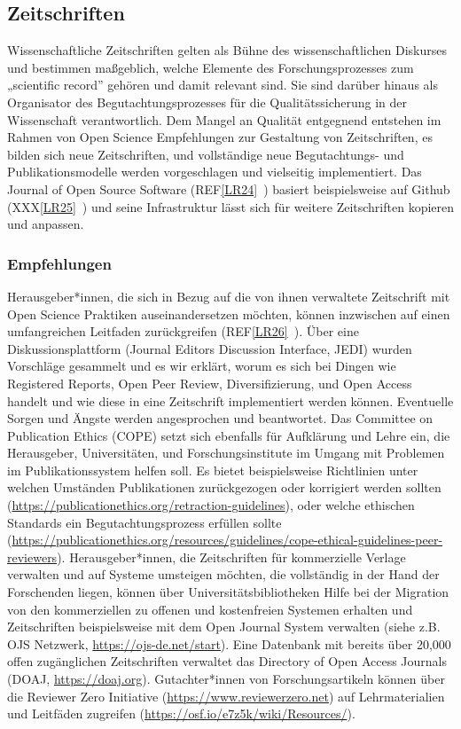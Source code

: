 \documentclass[
  letterpaper,
  DIV=11,
  numbers=noendperiod]{scrreprt}
\begin{document}
\subsection{Zeitschriften}\label{zeitschriften}

Wissenschaftliche Zeitschriften gelten als Bühne des wissenschaftlichen
Diskurses und bestimmen maßgeblich, welche Elemente des
Forschungsprozesses zum „scientific record'' gehören und damit relevant
sind. Sie sind darüber hinaus als Organisator des Begutachtungsprozesses
für die Qualitätssicherung in der Wissenschaft verantwortlich. Dem
Mangel an Qualität entgegnend entstehen im Rahmen von Open Science
Empfehlungen zur Gestaltung von Zeitschriften, es bilden sich neue
Zeitschriften, und vollständige neue Begutachtungs- und
Publikationsmodelle werden vorgeschlagen und vielseitig implementiert.
Das Journal of Open Source Software
(REF\hyperref[_msocom_24]{{[}LR24{]}}~) basiert beispielsweise auf
Github (XXX\hyperref[_msocom_25]{{[}LR25{]}}~) und seine Infrastruktur
lässt sich für weitere Zeitschriften kopieren und anpassen.

\subsubsection{Empfehlungen}\label{empfehlungen}

Herausgeber*innen, die sich in Bezug auf die von ihnen verwaltete
Zeitschrift mit Open Science Praktiken auseinandersetzen möchten, können
inzwischen auf einen umfangreichen Leitfaden zurückgreifen
(REF\hyperref[_msocom_26]{{[}LR26{]}}~). Über eine Diskussionsplattform
(Journal Editors Discussion Interface, JEDI) wurden Vorschläge gesammelt
und es wir erklärt, worum es sich bei Dingen wie Registered Reports,
Open Peer Review, Diversifizierung, und Open Access handelt und wie
diese in eine Zeitschrift implementiert werden können. Eventuelle Sorgen
und Ängste werden angesprochen und beantwortet. Das Committee on
Publication Ethics (COPE) setzt sich ebenfalls für Aufklärung und Lehre
ein, die Herausgeber, Universitäten, und Forschungsinstitute im Umgang
mit Problemen im Publikationssystem helfen soll. Es bietet
beispielsweise Richtlinien unter welchen Umständen Publikationen
zurückgezogen oder korrigiert werden sollten
(\url{https://publicationethics.org/retraction-guidelines}), oder welche
ethischen Standards ein Begutachtungsprozess erfüllen sollte
(\url{https://publicationethics.org/resources/guidelines/cope-ethical-guidelines-peer-reviewers}).
Herausgeber*innen, die Zeitschriften für kommerzielle Verlage verwalten
und auf Systeme umsteigen möchten, die vollständig in der Hand der
Forschenden liegen, können über Universitätsbibliotheken Hilfe bei der
Migration von den kommerziellen zu offenen und kostenfreien Systemen
erhalten und Zeitschriften beispielsweise mit dem Open Journal System
verwalten (siehe z.B. OJS Netzwerk, \url{https://ojs-de.net/start}).
Eine Datenbank mit bereits über 20,000 offen zugänglichen Zeitschriften
verwaltet das Directory of Open Access Journals (DOAJ,
\url{https://doaj.org}). Gutachter*innen von Forschungsartikeln können
über die Reviewer Zero Initiative (\url{https://www.reviewerzero.net})
auf Lehrmaterialien und Leitfäden zugreifen
(\url{https://osf.io/e7z5k/wiki/Resources/}). ~
\end{document}
